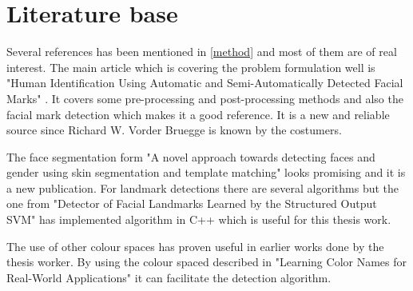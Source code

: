 \section{Literature base}

Several references has been mentioned in \cref{method} and most of them are of real interest. The main article which is covering the problem formulation well is "Human Identification Using Automatic and Semi-Automatically Detected Facial Marks" \cite{automatic_detector_2015}. It covers some pre-processing and post-processing methods and also the facial mark detection which makes it a good reference. It is a new and reliable source since Richard W. Vorder Bruegge is known by the costumers. 

The face segmentation form "A novel approach towards detecting faces and gender using skin segmentation and template matching" \cite{face_segmentation_skin} looks promising and it is a new publication. For landmark detections there are several algorithms but the one from "Detector of Facial Landmarks Learned by the Structured Output SVM" \cite{landmarks_SVM} has implemented algorithm in C++ which is useful for this thesis work.

The use of other colour spaces has proven useful in earlier works done by the thesis worker. By using the colour spaced described in "Learning Color Names for Real-World Applications" \cite{11_colours} it can facilitate the detection algorithm. 